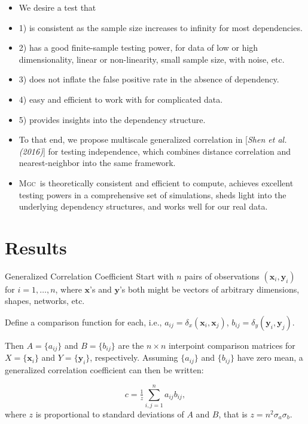 \documentclass{beamer}
\newcommand{\G}{c}
\providecommand{\mb}[1]{\boldsymbol{#1}}
\providecommand{\sct}[1]{{\normalfont\textsc{#1}}}
\newcommand{\Mgc}{\sct{Mgc}}
\begin{document}
\begin{frame}
\begin{itemize}[<+->]
\item We desire a test that
\item 1) is consistent as the sample size increases to infinity for most dependencies.
\item 2) has a good finite-sample testing power, for data of low or high dimensionality, linear or non-linearity, small sample size, with noise, etc.
\item 3) does not inflate the false positive rate in the absence of dependency.
\item 4) easy and efficient to work with for complicated data.
\item 5) provides insights into the dependency structure.
\item To that end, we propose multiscale generalized correlation in [\textit{Shen et al.(2016)}]\cite{ShenEtAl2016} for testing independence, which combines distance correlation and nearest-neighbor into the same framework.
\item \Mgc~is theoretically consistent and efficient to compute, achieves excellent testing powers in a comprehensive set of simulations, sheds light into the underlying dependency structures, and works well for our real data.
\end{itemize}
\end{frame}

\section{Results}
\begin{frame}{Generalized Correlation Coefficient}
Start with $n$ pairs of observations $(\mb{x}_i,\mb{y}_i)$ for $i=1,\ldots,n$, where $\mb{x}$'s and $\mb{y}$'s both might be vectors of arbitrary dimensions, shapes, networks, etc.  

\pause
\medskip
Define a comparison function for each, i.e., $a_{ij}=\delta_x(\mb{x}_i,\mb{x}_j)$, $b_{ij}=\delta_y(\mb{y}_i,\mb{y}_j)$. 
 
\pause
\medskip
Then $A=\{a_{ij}\}$ and $B=\{b_{ij}\}$ are the $n \times n$ interpoint comparison matrices for $X=\{\mb{x}_{i}\}$ and $Y=\{\mb{y}_{i}\}$, respectively. Assuming $\{a_{ij}\}$ and $\{b_{ij}\}$ have zero mean, a generalized correlation coefficient can then be written:

\pause
\begin{equation}
\label{generalCoef}
\G= \tfrac{1}{z} {\textstyle \sum_{i,j=1}^n a_{ij} b_{ij}},
\end{equation}
where $z$ is proportional to standard deviations of $A$ and $B$, that is $z=n^2\sigma_a \sigma_b$.
\end{frame}
\end{document}
